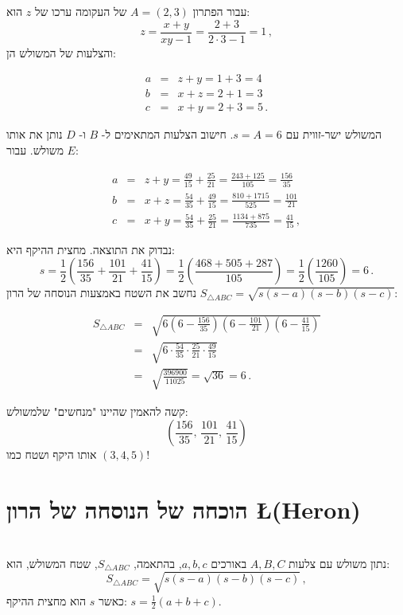 עבור הפתרון 
$A=(2,3)$
של העקומה ערכו של
$z$
הוא:
\[
z=\frac{x+y}{xy-1}=\frac{2+3}{2\cdot 3-1}=1\,,
\]
והצלעות של המשולש הן:

\begin{eqnarray*}
a &=& z+y = 1+3 = 4\\
b &=& x+z = 2+1=3\\
c &=& x+y = 2+3=5\,.
\end{eqnarray*}



המשולש ישר-זווית עם
$s=A=6$.
חישוב הצלעות המתאימים ל-%
$B$
ו-%
$D$
נותן את אותו משולש.
עבור
$E$:

\begin{eqnarray*}
a &=& z+y = \frac{49}{15} + \frac{25}{21} = \frac{243+125}{105}= \frac{156}{35}\\
b &=& x+z = \frac{54}{35} + \frac{49}{15} = \frac{810+1715}{525}=\frac{101}{21}\\
c &=& x+y = \frac{54}{35} + \frac{25}{21}  = \frac{1134+875}{735}=\frac{41}{15}\,,
\end{eqnarray*}

נבדוק את התוצאה. מחצית ההיקף היא:
\[
s=\frac{1}{2}\left(\frac{156}{35} + \frac{101}{21}+\frac{41}{15}\right) = \frac{1}{2}\left(\frac{468+505+287}{105}\right) = \frac{1}{2}\left(\frac{1260}{105}\right)= 6\,.
\]
נחשב את השטח באמצעות הנוסחה של הרון
$S_{\triangle ABC}= \sqrt{s(s-a)(s-b)(s-c)}$:

\begin{eqnarray*}
S_{\triangle ABC}&=& \sqrt{6 \left(6-\frac{156}{35}\right) \left(6-\frac{101}{21}\right) \left(6-\frac{41}{15}\right)}\\
&=& \sqrt{6 \cdot \frac{54}{35}\cdot \frac{25}{21} \cdot \frac{49}{15}}\\
&=& \sqrt{\frac{396900}{11025}}= \sqrt{36} = 6\,.
\end{eqnarray*}



קשה להאמין שהיינו "מנחשים" שלמשולש:
\[
\left(\frac{156}{35},\, \frac{101}{21},\,\frac{41}{15}\right)
\]
אותו היקף ושטח כמו
$(3,4,5)$!



\section{הוכחה של הנוסחה של הרון 
\L{(Heron)}}

\begin{theorem}\label{thm.heron}\mbox{}\\
נתון משולש עם צלעות
$A,B,C$
באורכים
$a,b,c$,
בהתאמה,
$S_{\triangle ABC}$,
שטח המשולש, הוא:
\[
S_{\triangle ABC} = \sqrt{s(s-a)(s-b)(s-c)}\,,
\]
כאשר
$s$
הוא מחצית ההיקף:
$s=\frac{1}{2}(a+b+c)$.
\end{theorem}

